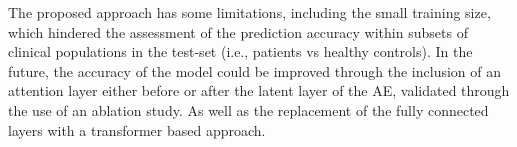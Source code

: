         The proposed approach has some limitations, including the small training size, which hindered the assessment of the prediction accuracy within subsets of clinical populations in the test-set (i.e., patients vs healthy controls). In the future, the accuracy of the model could be improved through the inclusion of an attention layer either before or after the latent layer of the \gls{AE}, validated through the use of an ablation study. As well as the replacement of the fully connected layers with a transformer based approach.
    